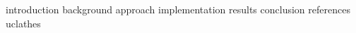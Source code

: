\documentclass [MS] {uclathes}
\begin{document}
\makeintropages
 {introduction}
 {background}
 {approach}
 {implementation}
 {results}
 {conclusion}
 {references}
 {uclathes}
\end{document}
